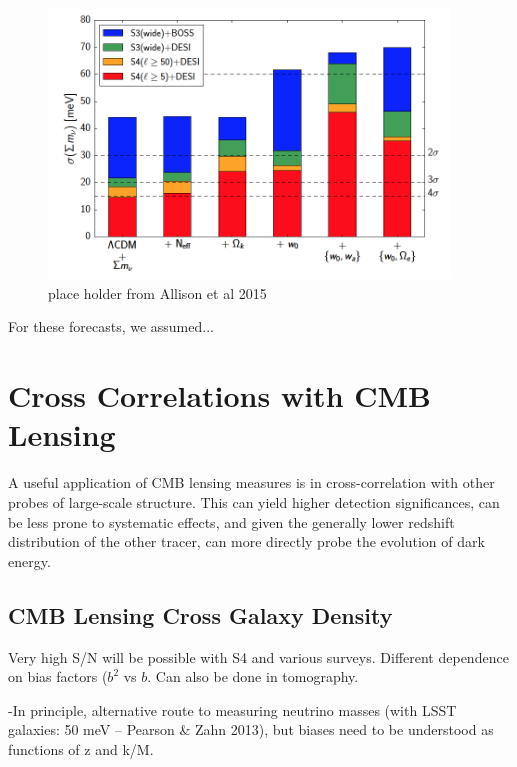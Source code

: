 \begin{figure}[h]
\includegraphics[width=0.95\textwidth]{CMBLensing/Allisonetal.png}
\caption{place holder from Allison et al 2015}
\label{nuForecasts}
\end{figure}


For these forecasts, we assumed...

\section{Cross Correlations with CMB Lensing}\label{cross}

A useful application of CMB lensing measures is in cross-correlation with other probes of large-scale structure.  This can yield higher detection significances, can be less prone to systematic effects, and given the generally lower redshift distribution of the other tracer, can more directly probe the evolution of dark energy.


\subsection{CMB Lensing Cross Galaxy Density}


Very high S/N will be possible with S4 and various surveys.   Different dependence on bias factors ($b^2$ vs $b$.  Can also be done in tomography.

-In principle, alternative route to measuring neutrino masses (with LSST galaxies: 50 meV -- Pearson \& Zahn 2013), but biases need to be understood as functions of z and k/M.  

